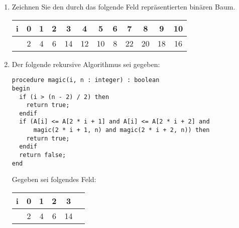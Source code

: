 \documentclass{lehramt-informatik-aufgabe}
\begin{document}
\begin{enumerate}


\item Zeichnen Sie den durch das folgende Feld repräsentierten binären
Baum.

\begin{center}
\begin{tabular}{|r|c|c|c|c|c|c|c|c|c|c|c|}
\hline
i        & 0 & 1 & 2 & 3  & 4  & 5  & 6 & 7  & 8  & 9  & 10\\\hline
\p{A[i]} & 2 & 4 & 6 & 14 & 12 & 10 & 8 & 22 & 20 & 18 & 16\\\hline
\end{tabular}
\end{center}

\begin{liAntwort}
\begin{center}
\end{center}
\end{liAntwort}


\item Der folgende rekursive Algorithmus sei gegeben:


\begin{verbatim}
procedure magic(i, n : integer) : boolean
begin
  if (i > (n - 2) / 2) then
    return true;
  endif
  if (A[i] <= A[2 * i + 1] and A[i] <= A[2 * i + 2] and
      magic(2 * i + 1, n) and magic(2 * i + 2, n)) then
    return true;
  endif
  return false;
end
\end{verbatim}



Gegeben sei folgendes Feld:

\begin{center}
\begin{tabular}{|r|c|c|c|c|c|}
\hline
i        & 0 & 1 & 2 & 3  \\\hline
\p{A[i]} & 2 & 4 & 6 & 14 \\\hline
\end{tabular}
\end{center}


\end{enumerate}
\end{document}
